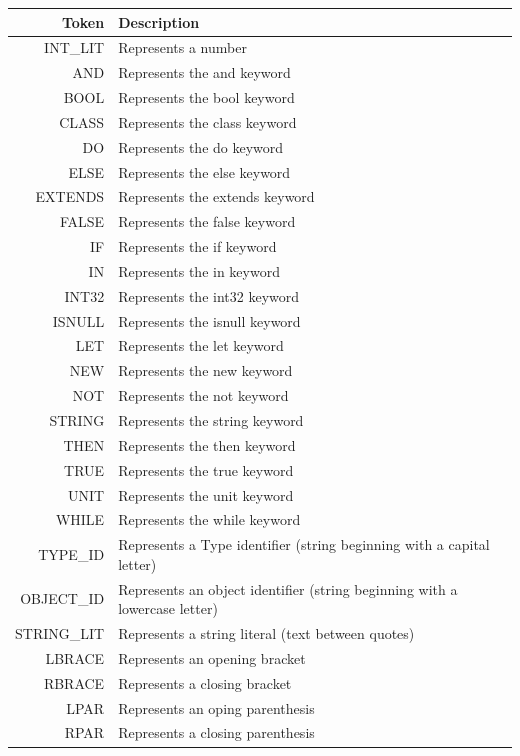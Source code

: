 \documentclass[a4paper,11pt]{article}
\begin{document}
    \begin{table}[hp]
      \centering
      \begin{tabular}{|r|p{10cm}|}
      \hline
      Token & Description\\\hline
      INT\_LIT & Represents a number\\
      AND & Represents the and keyword\\
      BOOL &Represents the bool keyword\\
      CLASS & Represents the class keyword\\
      DO & Represents the do keyword\\
      ELSE & Represents the else keyword\\
      EXTENDS & Represents the extends keyword\\
      FALSE & Represents the false keyword \\
      IF & Represents the if keyword\\
      IN & Represents the in keyword\\
      INT32 & Represents the int32 keyword\\
      ISNULL & Represents the isnull keyword\\
      LET & Represents the let keyword\\
      NEW & Represents the new keyword\\
      NOT & Represents the not keyword\\
      STRING & Represents the string keyword\\
      THEN & Represents the then keyword\\
      TRUE & Represents the true keyword\\
      UNIT & Represents the unit keyword\\
      WHILE & Represents the while keyword\\
      TYPE\_ID & Represents a Type identifier (string beginning with a capital letter)\\
      OBJECT\_ID & Represents an object identifier (string beginning with a lowercase letter)\\
      STRING\_LIT & Represents a string literal (text between quotes)\\
      LBRACE & Represents an opening bracket\\
      RBRACE& Represents a closing bracket\\
      LPAR & Represents an oping parenthesis\\
      RPAR & Represents a closing parenthesis\\

\end{tabular}
\end{table}
\end{document}
